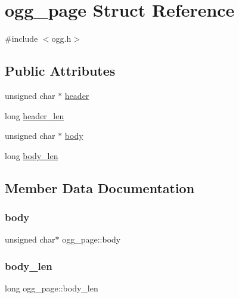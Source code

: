 \hypertarget{structogg__page}{}\section{ogg\+\_\+page Struct Reference}
\label{structogg__page}


{\ttfamily \#include $<$ogg.\+h$>$}

\subsection*{Public Attributes}
\begin{DoxyCompactItemize}
\item 
unsigned char $\ast$ \hyperlink{structogg__page_a9f251dc1a96fbfd84ff2585fbbc03c16}{header}
\item 
long \hyperlink{structogg__page_aeaa6edc2ff9f2c5cc8f0ecf001936b7b}{header\+\_\+len}
\item 
unsigned char $\ast$ \hyperlink{structogg__page_af2fdee76f20ac267c6233f1d5f8afd30}{body}
\item 
long \hyperlink{structogg__page_ac6e649f0001899b512935448a903abac}{body\+\_\+len}
\end{DoxyCompactItemize}


\subsection{Member Data Documentation}
\mbox{\label{structogg__page_af2fdee76f20ac267c6233f1d5f8afd30}} 
\subsubsection{\texorpdfstring{body}{body}}
{\footnotesize\ttfamily unsigned char$\ast$ ogg\+\_\+page\+::body}

\mbox{\label{structogg__page_ac6e649f0001899b512935448a903abac}} 
\subsubsection{\texorpdfstring{body\+\_\+len}{body\_len}}
{\footnotesize\ttfamily long ogg\+\_\+page\+::body\+\_\+len}

